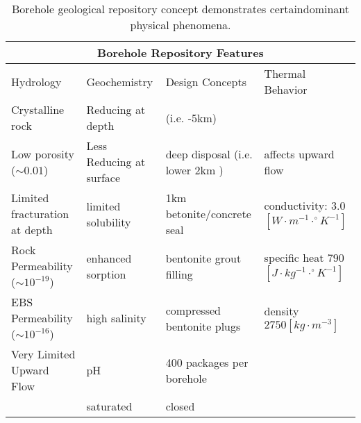 %
\begin{table}[h!]
  \centering
  \footnotesize{
  \begin{tabular}{|l|l|l|l|}
    \multicolumn{4}{c}{\textbf{Borehole Repository Features}}\\
    \hline
    Hydrology & Geochemistry & Design Concepts & Thermal Behavior \\ 
    \hline
    Crystalline rock&Reducing at depth&(i.e. -5km\cite{clayton_generic_2011}) &\\
    Low porosity ($\sim 0.01$)&Less Reducing at surface& deep disposal (i.e.  lower 2km \cite{clayton_generic_2011})&affects upward flow\\
    Limited fracturation at depth&limited solubility &1km betonite/concrete seal &conductivity: 3.0 $[W\cdot m^{-1}\cdot^\circ K^{-1}]$\\
    Rock Permeability ($\sim 10^{-19}$) &enhanced sorption &bentonite grout filling&specific heat 790 $[J\cdot kg^{-1}\cdot^\circ K^{-1}]$\\
    EBS Permeability ($\sim 10^{-16}$) &high salinity&compressed bentonite plugs&density $2750 [kg\cdot m^{-3}]$\\
    Very Limited Upward Flow&pH&400 packages per borehole&\\
    &saturated&closed&\\
    \hline
  \end{tabular}
  \caption[Borehole Repository Features]{Borehole geological repository 
  concept demonstrates certaindominant physical phenomena. }
  \label{tab:borehole_tab}
  }
\end{table}
